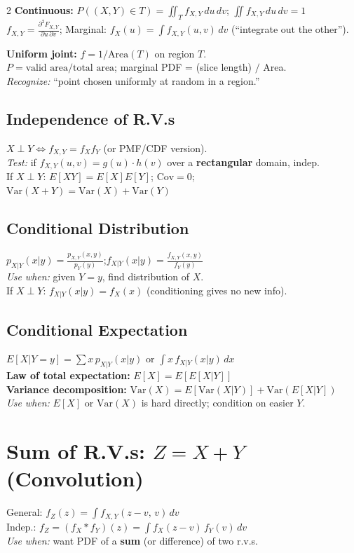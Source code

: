 \documentclass[10pt]{article}
\begin{document}
\begin{multicols*}{2}
\textbf{Continuous:} $P((X,Y) \in T) = \iint_T f_{X,Y}\,du\,dv$;\; $\iint f_{X,Y}\,du\,dv = 1$ \\
$f_{X,Y} = \frac{\partial^2 F_{X,Y}}{\partial u\, \partial v}$;\;\;
Marginal: $f_X(u) = \int f_{X,Y}(u,v)\,dv$ (``integrate out the other'').

\textbf{Uniform joint:} $f = 1/\text{Area}(T)$ on region $T$. \\
$P = \text{valid area} / \text{total area}$;\; marginal PDF = (slice length) $/$ Area. \\
\textit{Recognize:} ``point chosen uniformly at random in a region.''

\subsection{Independence of R.V.s}
$X \perp Y \iff f_{X,Y} = f_X f_Y$ (or PMF/CDF version). \\
\textit{Test:} if $f_{X,Y}(u,v) = g(u) \cdot h(v)$ over a \textbf{rectangular} domain, indep. \\
If $X \perp Y$: $E[XY] = E[X]E[Y]$;\; $\text{Cov}=0$;\; $\text{Var}(X+Y)=\text{Var}(X)+\text{Var}(Y)$

\subsection{Conditional Distribution}
$p_{X|Y}(x|y) = \frac{p_{X,Y}(x,y)}{p_Y(y)}$;\quad $f_{X|Y}(x|y) = \frac{f_{X,Y}(x,y)}{f_Y(y)}$ \\
\textit{Use when:} given $Y=y$, find distribution of $X$. \\
If $X \perp Y$: $f_{X|Y}(x|y) = f_X(x)$ (conditioning gives no new info).

\subsection{Conditional Expectation}
$E[X|Y\!=\!y] = \sum x\, p_{X|Y}(x|y)$ or $\int x\, f_{X|Y}(x|y)\,dx$ \\
\textbf{Law of total expectation:} $E[X] = E[E[X|Y]]$ \\
\textbf{Variance decomposition:} $\text{Var}(X) = E[\text{Var}(X|Y)] + \text{Var}(E[X|Y])$ \\
\textit{Use when:} $E[X]$ or $\text{Var}(X)$ is hard directly; condition on easier $Y$.

\section{Sum of R.V.s: $Z = X + Y$ (Convolution)}
General: $f_Z(z) = \int f_{X,Y}(z\!-\!v,\, v)\,dv$ \\
Indep.: $f_Z = (f_X * f_Y)(z) = \int f_X(z\!-\!v)\,f_Y(v)\,dv$ \\
\textit{Use when:} want PDF of a \textbf{sum} (or difference) of two r.v.s.


\end{multicols*}
\end{document}
